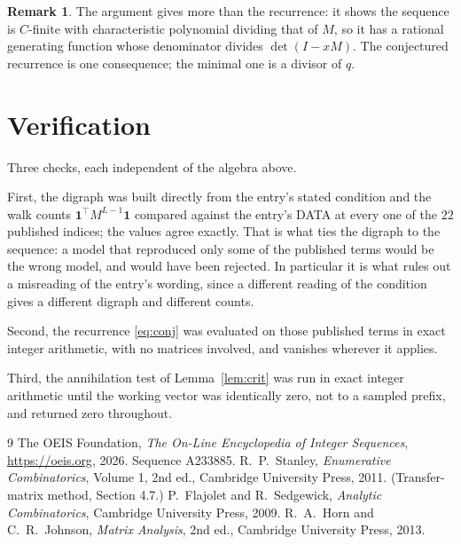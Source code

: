\documentclass[11pt,a4paper]{article}
\theoremstyle{plain}
\theoremstyle{definition}
\newtheorem{remark}[theorem]{Remark}
\begin{document}
\begin{remark}
The argument gives more than the recurrence: it shows the sequence is $C$-finite with
characteristic polynomial dividing that of $M$, so it has a rational generating function
whose denominator divides $\det(I-xM)$. The conjectured recurrence is one consequence; the
minimal one is a divisor of $q$.
\end{remark}

\section{Verification}

Three checks, each independent of the algebra above.

First, the digraph was built directly from the entry's stated condition and the walk counts
$\mathbf{1}^{\!\top}M^{L-1}\mathbf{1}$ compared against the entry's DATA at
every one of the $22$ published indices; the values agree exactly. That is what ties
the digraph to the sequence: a model that reproduced only some of the published terms would
be the wrong model, and would have been rejected. In particular it is what rules out a
misreading of the entry's wording, since a different reading of the condition gives a
different digraph and different counts.

Second, the recurrence \eqref{eq:conj} was evaluated on those published terms in exact
integer arithmetic, with no matrices involved, and vanishes wherever it applies.

Third, the annihilation test of Lemma~\ref{lem:crit} was run in exact integer arithmetic
until the working vector was identically zero, not to a sampled prefix, and returned zero
throughout.

\begin{thebibliography}{9}
 The OEIS Foundation, \emph{The On-Line Encyclopedia of Integer
Sequences}, \url{https://oeis.org}, 2026. Sequence A233885.
 R.~P.~Stanley, \emph{Enumerative Combinatorics}, Volume 1, 2nd ed.,
Cambridge University Press, 2011. (Transfer-matrix method, Section 4.7.)
 P.~Flajolet and R.~Sedgewick, \emph{Analytic Combinatorics}, Cambridge
University Press, 2009.
 R.~A.~Horn and C.~R.~Johnson, \emph{Matrix Analysis}, 2nd ed., Cambridge
University Press, 2013.
\end{thebibliography}
\end{document}
